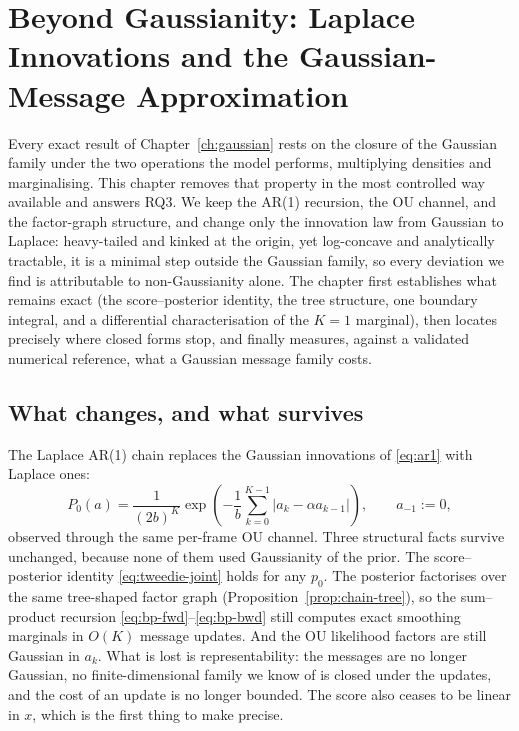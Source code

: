 \chapter{Beyond Gaussianity: Laplace Innovations and the Gaussian-Message
Approximation}\label{ch:laplace}\label{sec:bp-nongaussian}

Every exact result of Chapter~\ref{ch:gaussian} rests on the closure of
the Gaussian family under the two operations the model performs,
multiplying densities and marginalising. This chapter removes that
property in the most controlled way available and answers RQ3. We keep
the AR(1) recursion, the OU channel, and the factor-graph structure, and
change only the innovation law from Gaussian to Laplace: heavy-tailed and
kinked at the origin, yet log-concave and analytically tractable, it is a
minimal step outside the Gaussian family, so every deviation we find is
attributable to non-Gaussianity alone. The chapter first establishes what
remains exact (the score--posterior identity, the tree structure, one
boundary integral, and a differential characterisation of the $K=1$
marginal), then locates precisely where closed forms stop, and finally
measures, against a validated numerical reference, what a Gaussian
message family costs.

\section{What changes, and what survives}\label{sec:l-model}

The Laplace AR(1) chain replaces the Gaussian innovations of
\eqref{eq:ar1} with Laplace ones:
\begin{equation}
  P_0(a) = \frac{1}{(2b)^K}
  \exp\!\left( -\frac{1}{b} \sum_{k=0}^{K-1}
    \big| a_k - \alpha a_{k-1} \big| \right),
  \qquad a_{-1} := 0 ,
  \label{eq:l-chain-prior}
\end{equation}
observed through the same per-frame OU channel. Three structural facts
survive unchanged, because none of them used Gaussianity of the prior.
The score--posterior identity \eqref{eq:tweedie-joint} holds for any
$p_0$. The posterior factorises over the same tree-shaped factor graph
(Proposition~\ref{prop:chain-tree}), so the sum--product recursion
\eqref{eq:bp-fwd}--\eqref{eq:bp-bwd} still computes exact smoothing
marginals in $O(K)$ message updates. And the OU likelihood factors are
still Gaussian in $a_k$. What is lost is representability: the messages
are no longer Gaussian, no finite-dimensional family we know of is closed
under the updates, and the cost of an update is no longer bounded. The
score also ceases to be linear in $x$, which is the first thing to make
precise.

